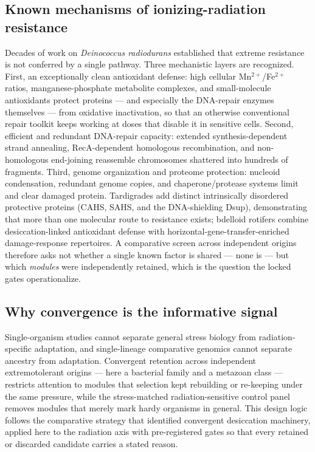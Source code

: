 \subsection{Known mechanisms of ionizing-radiation resistance}
Decades of work on \emph{Deinococcus radiodurans} established that extreme
resistance is not conferred by a single pathway. Three mechanistic layers are
recognized. First, an exceptionally clean antioxidant defense: high cellular
Mn$^{2+}$/Fe$^{2+}$ ratios, manganese-phosphate metabolite complexes, and
small-molecule antioxidants protect proteins --- and especially the DNA-repair
enzymes themselves --- from oxidative inactivation, so that an otherwise
conventional repair toolkit keeps working at doses that disable it in
sensitive cells. Second, efficient and redundant DNA-repair capacity:
extended synthesis-dependent strand annealing, RecA-dependent homologous
recombination, and non-homologous end-joining reassemble chromosomes
shattered into hundreds of fragments. Third, genome organization and
proteome protection: nucleoid condensation, redundant genome copies, and
chaperone/protease systems limit and clear damaged protein. Tardigrades add
distinct intrinsically disordered protective proteins (CAHS, SAHS, and the
DNA-shielding Dsup), demonstrating that more than one molecular route to
resistance exists; bdelloid rotifers combine desiccation-linked antioxidant
defense with horizontal-gene-transfer-enriched damage-response repertoires.
A comparative screen across independent origins therefore asks not whether a
single known factor is shared --- none is --- but which \emph{modules} were
independently retained, which is the question the locked gates operationalize.

\subsection{Why convergence is the informative signal}
Single-organism studies cannot separate general stress biology from
radiation-specific adaptation, and single-lineage comparative genomics cannot
separate ancestry from adaptation. Convergent retention across independent
extremotolerant origins --- here a bacterial family and a metazoan class ---
restricts attention to modules that selection kept rebuilding or re-keeping
under the same pressure, while the stress-matched radiation-sensitive control
panel removes modules that merely mark hardy organisms in general. This
design logic follows the comparative strategy that identified convergent
desiccation machinery, applied here to the radiation axis with pre-registered
gates so that every retained or discarded candidate carries a stated reason.
